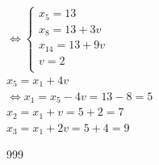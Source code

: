 \documentclass[a4paper]{article}
\begin{document}
$\Leftrightarrow \left\{
\begin{array}{l}
    x_{5} = 13 \\
	
    x_{8} = 13 + 3v \\
	
	x_{14} = 13 + 9v \\
	
	v  = 2 \\
\end{array}
\right.$ \\

$ x_{5} = x_{1} + 4v $ \\

$\Leftrightarrow  x_{1} = x_{5} - 4v = 13 - 8 = 5 $ \\ 

$ x_{2} = x_{1} + v = 5 + 2 = 7 $ \\

$ x_{3} = x_{1} + 2v = 5 + 4 = 9 $ \\



\begin{thebibliography}{999}
\end{thebibliography}
\end{document}
